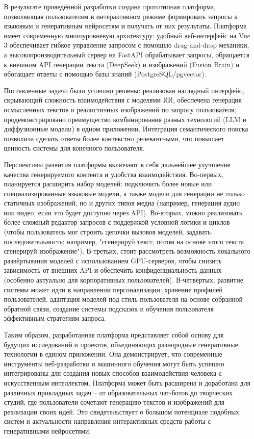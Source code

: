 В результате проведённой разработки создана прототипная платформа, позволяющая пользователям в интерактивном режиме формировать запросы к языковым и генеративным нейросетям и получать от них результаты. Платформа имеет современную многоуровневую архитектуру: удобный веб-интерфейс на Vue 3 обеспечивает гибкое управление запросом с помощью drag-and-drop механики, а высокопроизводительный сервер на FastAPI обрабатывает запросы, обращается к внешним API генерации текста (DeepSeek) и изображений (Fusion Brain) и обогащает ответы с помощью базы знаний (PostgreSQL/pgvector).

Поставленные задачи были успешно решены: реализован наглядный интерфейс, скрывающий сложность взаимодействия с моделями ИИ; обеспечена генерация осмысленных текстов и реалистичных изображений по запросу пользователя; продемонстрировано преимущество комбинирования разных технологий (LLM и диффузионные модели) в одном приложении. Интеграция семантического поиска позволила сделать ответы более контекстно релевантными, что повышает ценность системы для конечного пользователя.

Перспективы развития платформы включают в себя дальнейшее улучшение качества генерируемого контента и удобства взаимодействия. Во-первых, планируется расширить набор моделей: подключить более новые или специализированные языковые модели, а также модели для генерации не только статичных изображений, но и других типов медиа (например, генерация аудио или видео, если это будет доступно через API). Во-вторых, можно реализовать более сложный редактор запросов с поддержкой условной логики и циклов (чтобы пользователь мог строить цепочки вызовов моделей, задавать последовательность: например, "сгенерируй текст, потом на основе этого текста сгенерируй изображение"). В-третьих, стоит рассмотреть возможность локального развёртывания моделей с использованием GPU-серверов, чтобы снизить зависимость от внешних API и обеспечить конфиденциальность данных (особенно актуально для корпоративных пользователей). В-четвёртых, развитие системы может идти в направлении персонализации: хранение профилей пользователей, адаптация моделей под стиль пользователя на основе собранной обратной связи, создание системы подсказок и обучения пользователя эффективным стратегиям запроса.

Таким образом, разработанная платформа представляет собой основу для будущих исследований и проектов, объединяющих разнородные генеративные технологии в едином приложении. Она демонстрирует, что современные инструменты веб-разработки и машинного обучения могут быть успешно интегрированы для создания новых способов взаимодействия человека с искусственным интеллектом. Платформа может быть расширена и доработана для различных прикладных задач -- от образовательных чат-ботов до творческих студий, где пользователи сочетают генерацию текстов и изображений для реализации своих идей. Это свидетельствует о большом потенциале подобных систем и актуальности направления интерактивных средств работы с генеративными нейросетями.